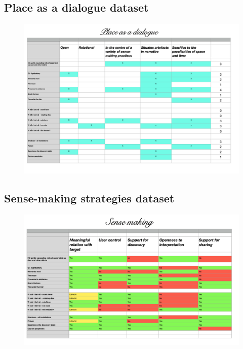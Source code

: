 \subsection{Place as a dialogue dataset}
\begin{figure}[H]
\includegraphics[width=13cm]{pictures/appendix/table_placedialogue.png}
\centering 
\end{figure}

\subsection{Sense-making strategies dataset}
\begin{figure}[H]
\includegraphics[width=13cm]{pictures/appendix/table_sensemaking.png}
\centering 
\end{figure}


